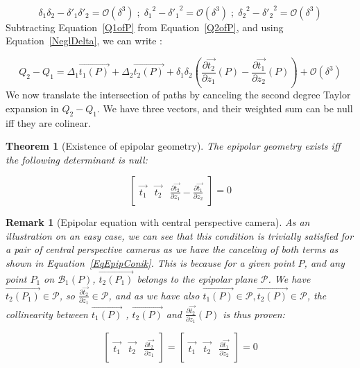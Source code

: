 \documentclass{ipol}
\newcommand{\Bund}[1]{\ensuremath{\mathcal{B}_{#1}}}
\newcommand{\BundO}{\Bund{1}}
\newcommand{\BigV}[1]{\ensuremath{\overrightarrow{#1}}}
\newcommand{\TanO}[1]{\BigV{t_1#1}}
\newcommand{\TanT}[1]{\BigV{t_2#1}}
\newcommand{\Negl}[1]{\ensuremath{\mathcal{O}(#1)}}
\newcommand{\DerPart}[2]{\frac{\partial #1}{\partial #2}}
\newtheorem{theorem}{Theorem}
\newtheorem{remark}{Remark}
\begin{document}
\begin{equation}
   \delta_1  \delta_2 -  \delta'_1  \delta'_2  = \Negl{\delta^3} \;;\;
   {\delta_1}^2 - {\delta'_1}^2 =  \Negl{\delta^3} \;;\;
   {\delta_2}^2 - {\delta'_2}^2 =  \Negl{\delta^3} 
   \label{NeglDelta}
\end{equation}
%
Subtracting Equation~\eqref{Q1ofP} from Equation~\eqref{Q2ofP}, and using Equation~\eqref{NeglDelta}, we can write :

\begin{equation}
    Q_2 -Q_1 =   \Delta_1 \TanO{(P)} +   \Delta_2 \TanT{(P)}  
               + \delta_1  \delta_2(\DerPart { \TanT{}}{z_1}(P)  -\DerPart { \TanO{}}{z_2}(P) )
               + \Negl{\delta^3}
\end{equation}
%
We now translate the intersection of paths by canceling the second degree Taylor expansion in $Q_2 -Q_1$. We have three vectors, and their weighted sum can be null iff they are colinear.

\begin{theorem}[Existence of epipolar geometry]
The epipolar geometry exists iff the following determinant is null:

\begin{equation}
\left[ \begin{array}{c|c|c}
\TanO{} & \TanT{}  & \DerPart { \TanT{}}{z_1}  -\DerPart { \TanO{}}{z_2}  
\end{array} \right]  
=0
\label{EpiplabEq}
\end{equation}

\end{theorem}

\begin{remark}[Epipolar equation with central perspective camera]
As an illustration on an easy case, we can see that this condition is trivially 
satisfied for a pair of central perspective cameras as we have the canceling of both terms as shown
in Equation~\eqref{EqEpipConik}. This is because for a given point $P$,
and any point $P_1$ on $\BundO(P)$, $\TanT{(P_1)}$ belongs to the epipolar
plane $\mathcal{P}$. We have $\TanT{(P_1)} \in \mathcal{P}$, so $\DerPart { \TanT{}}{z_1} \in \mathcal{P}$,
and as we have also $\TanO{(P)} \in  \mathcal{P}, \TanT{(P)} \in  \mathcal{P}$, the collinearity
between $\TanO{(P)}$ , $\TanT{(P)}$ and $\DerPart { \TanT{}}{z_1}(P)$ is thus proven:

\begin{equation}
\left[ \begin{array}{c|c|c}
\TanO{} & \TanT{}  & \DerPart { \TanT{}}{z_1}  
\end{array} \right]  
=\left[ \begin{array}{c|c|c}
\TanO{} & \TanT{}  & \DerPart { \TanO{}}{z_2}  
\end{array} \right]  
=0
\label{EqEpipConik}
\end{equation}
\end{remark}
\end{document}
